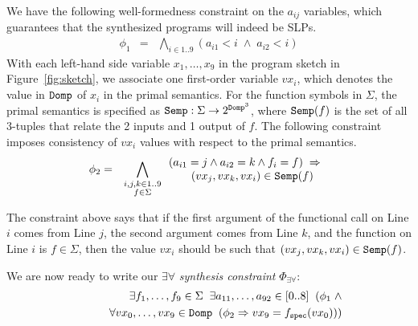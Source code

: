 \documentclass[preprint]{sig-alternate-05-2015}
\def\semp{{\tt{Semp}}}
\def\domp{{\tt{Domp}}}
\def\spec{{\tt{spec}}}
\def\Sig{{\Sigma}}
\begin{document}
We have the following well-formedness constraint on the $a_{ij}$
variables, which guarantees that the synthesized
programs will indeed be SLPs.
\begin{eqnarray*}
  \phi_1 & = & \bigwedge_{i\in 1..9} (a_{i1} < i \;\wedge\; a_{i2}<i)
\end{eqnarray*}
With each left-hand side variable $x_1,\ldots,x_9$ in the program sketch in Figure~\ref{fig:sketch},
we associate one first-order variable
$vx_i$, which denotes the value in $\domp$ of $x_i$ in the primal semantics.
For the function symbols in $\Sig$,
the primal semantics is specified as
$\semp: \Sig \rightarrow 2^{\domp^3}$, where
$\semp(f)$ %
is the set of all $3$-tuples that relate the 2 inputs and 1 output of $f$.
The following constraint imposes consistency of $vx_i$ values with respect to the primal semantics.
\begin{eqnarray*}
  \phi_2 & = & \bigwedge_{\substack{i,j,k\in 1..9\\ f\in\Sig}}
   \begin{array}{l}
    (a_{i1} = j \wedge a_{i2}=k \wedge f_i=f)\;\Rightarrow\;
    \\
    \qquad (vx_j,vx_k,vx_i) \in \semp(f) 
  \end{array}
\end{eqnarray*}

\smallskip\noindent
The constraint above says that if
the first argument of the functional call on Line $i$ comes from Line $j$,
the second argument comes from Line $k$, and
the function on Line $i$ is $f\in\Sig$, then
the value $vx_i$ should be such that $(vx_j,vx_k,vx_i)\in \semp(f)$.


We are now ready to write our $\exists\forall$ {\em synthesis constraint} $\Phi_{\exists\forall}$: 
\begin{eqnarray*}
  &&\exists{f_1,\ldots,f_9}\in\Sig\;\;
  \exists{a_{11},\ldots,a_{92}}\in [0..8]\;\;
  (\phi_1 \; \wedge
  \\ && \qquad
  \forall{vx_0,\ldots,vx_9}\in\domp\;\;(\phi_2 \Rightarrow vx_9 = f_\spec(vx_0)))
\end{eqnarray*}
\end{document}
